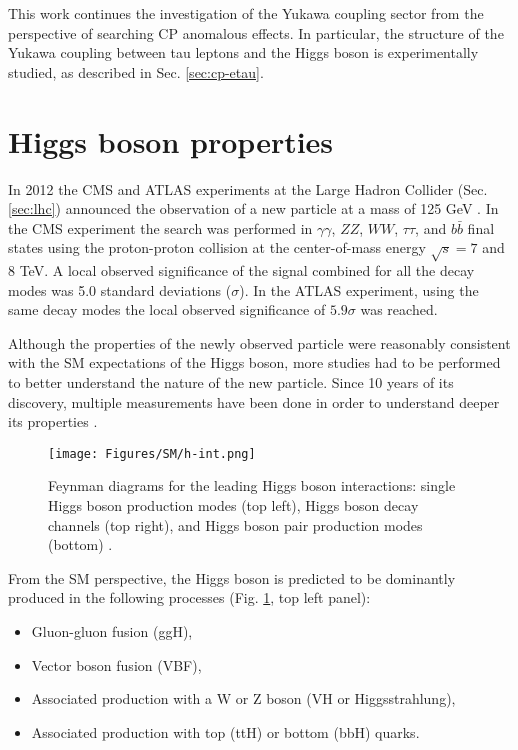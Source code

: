This work continues the investigation of the Yukawa coupling sector from the perspective of searching CP anomalous effects. In particular, the structure of the Yukawa coupling between tau leptons and the Higgs boson is experimentally studied, as described in Sec. \ref{sec:cp-etau}.

\section{Higgs boson properties}\label{sec:higgs}

In 2012 the CMS and ATLAS experiments at the Large Hadron Collider (Sec. \ref{sec:lhc}) announced the observation of a new particle at a mass of 125 GeV \cite{ATLAS:2012yve, CMS:2012qbp}. In the CMS experiment the search was performed in $\gamma\gamma$, $ZZ$, $WW$, $\tau\tau$, and $b\bar{b}$ final states using the proton-proton collision at the center-of-mass energy $\sqrt{s} = 7$ and $8$ TeV. A local observed significance of the signal combined for all the decay modes was 5.0 standard deviations ($\sigma$). In the ATLAS experiment, using the same decay modes the local observed significance of $5.9\sigma$ was reached. 

Although the properties of the newly observed particle were reasonably consistent with the SM expectations of the Higgs boson, more studies had to be performed to better understand the nature of the new particle. Since 10 years of its discovery, multiple measurements have been done in order to understand deeper its properties \cite{CMS:2022dwd, ATLAS:2022vkf}.  

\begin{figure}[!h]
    \centering
    \texttt{[image: Figures/SM/h-int.png]}
    \caption{Feynman diagrams for the leading Higgs boson interactions: single Higgs boson production modes (top left), Higgs boson decay channels (top right), and Higgs boson pair production modes (bottom) \cite{CMS:2022dwd}.}
    \label{fig:h-int}
\end{figure}

From the SM perspective, the Higgs boson is predicted to be dominantly produced in the following processes (Fig. \ref{fig:h-int}, top left panel): 
\begin{itemize}
    \item Gluon-gluon fusion (ggH),
    \item Vector boson fusion (VBF),
    \item Associated production with a W or Z boson (VH or Higgsstrahlung),
    \item Associated production with top (ttH) or bottom (bbH) quarks.
\end{itemize}


